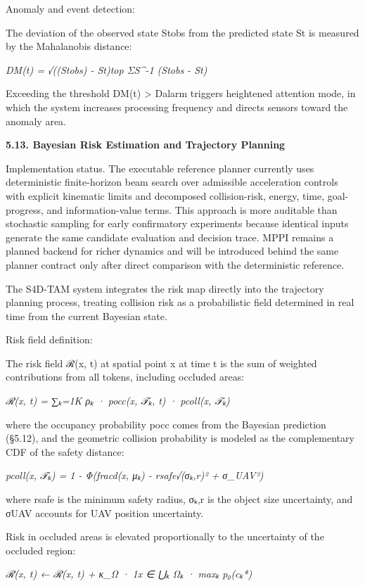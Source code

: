 \documentclass[
]{article}
\begin{document}
Anomaly and event detection:

The deviation of the observed state Stobs from the predicted state St is
measured by the Mahalanobis distance:

\emph{DM(t) = √((Stobs) - St)top ΣS\^{}-1 (Stobs - St)}

Exceeding the threshold DM(t) \textgreater{} Dalarm triggers heightened
attention mode, in which the system increases processing frequency and
directs sensors toward the anomaly area.

\textbf{5.13. Bayesian Risk Estimation and Trajectory Planning}

Implementation status. The executable reference planner currently uses
deterministic finite-horizon beam search over admissible acceleration
controls with explicit kinematic limits and decomposed collision-risk,
energy, time, goal-progress, and information-value terms. This approach
is more auditable than stochastic sampling for early confirmatory
experiments because identical inputs generate the same candidate
evaluation and decision trace. MPPI remains a planned backend for richer
dynamics and will be introduced behind the same planner contract only
after direct comparison with the deterministic reference.

The S4D-TAM system integrates the risk map directly into the trajectory
planning process, treating collision risk as a probabilistic field
determined in real time from the current Bayesian state.

Risk field definition:

The risk field ℛ(x, t) at spatial point x at time t is the sum of
weighted contributions from all tokens, including occluded areas:

\emph{ℛ(x, t) = ∑ₖ=1K ρₖ · pocc(x, 𝒯ₖ, t) · pcoll(x, 𝒯ₖ)}

where the occupancy probability pocc comes from the Bayesian prediction
(§5.12), and the geometric collision probability is modeled as the
complementary CDF of the safety distance:

\emph{pcoll(x, 𝒯ₖ) = 1 - Φ(fracd(x, μₖ) - rsafe√(σₖ,r)² + σ\_UAV²)}

where rsafe is the minimum safety radius, σₖ,r is the object size
uncertainty, and σUAV accounts for UAV position uncertainty.

Risk in occluded areas is elevated proportionally to the uncertainty of
the occluded region:

\emph{ℛ(x, t) ← ℛ(x, t) + κ\_Ω · 1x ∈ ⋃ₖ Ωₖ · maxₖ p₀(cₖ*)}
\end{document}
